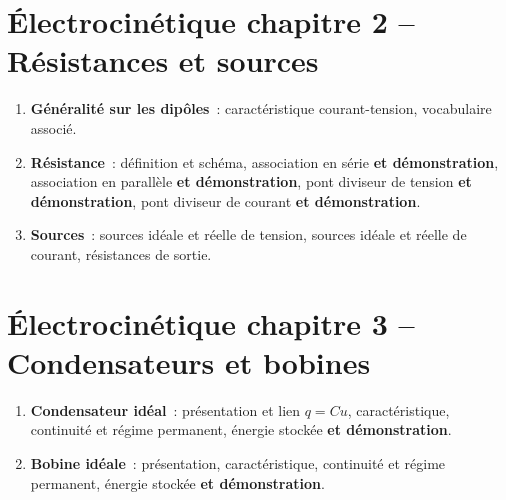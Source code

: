 \documentclass[a4paper, 12pt, final, garamond]{book}
\begin{document}
\section*{Électrocinétique chapitre 2 -- Résistances et sources}
\begin{enumerate}[label=\Roman*]
    \item \textbf{Généralité sur les dipôles}~: caractéristique courant-tension,
        vocabulaire associé.
    \item \textbf{Résistance}~: définition et schéma, association en série
        \textbf{et démonstration}, association en parallèle \textbf{et
        démonstration}, pont diviseur de tension \textbf{et démonstration}, pont
        diviseur de courant \textbf{et démonstration}.
    \item \textbf{Sources}~: sources idéale et réelle de tension, sources idéale
        et réelle de courant, résistances de sortie.
\end{enumerate}
\section*{Électrocinétique chapitre 3 -- Condensateurs et bobines}
\begin{enumerate}[label=\Roman*]
    \item \textbf{Condensateur idéal}~: présentation et lien $q=Cu$,
        caractéristique, continuité et régime permanent, énergie stockée
        \textbf{et démonstration}.
    \item \textbf{Bobine idéale}~: présentation, caractéristique, continuité et
        régime permanent, énergie stockée \textbf{et démonstration}.
\end{enumerate}
\end{document}
